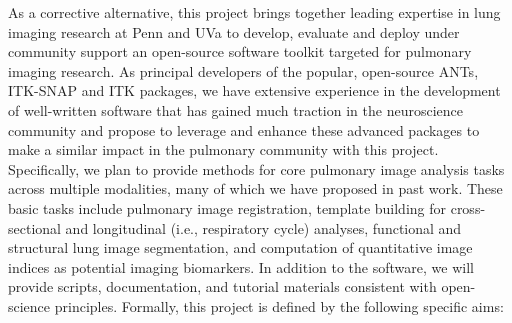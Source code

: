 \documentclass[11pt,]{article}
\begin{document}
As a corrective alternative, this project brings together leading
expertise in lung imaging research at Penn and UVa to develop, evaluate
and deploy under community support an open-source software toolkit
targeted for pulmonary imaging research. As principal developers of the
popular, open-source ANTs, ITK-SNAP and ITK packages, we have extensive
experience in the development of well-written software that has gained
much traction in the neuroscience community and propose to leverage and
enhance these advanced packages to make a similar impact in the
pulmonary community with this project. Specifically, we plan to provide
methods for core pulmonary image analysis tasks across multiple
modalities, many of which we have proposed in past work. These basic
tasks include pulmonary image registration, template building for
cross-sectional and longitudinal (i.e., respiratory cycle) analyses,
functional and structural lung image segmentation, and computation of
quantitative image indices as potential imaging biomarkers. In addition
to the software, we will provide scripts, documentation, and tutorial
materials consistent with open-science principles. Formally, this
project is defined by the following specific aims:
\end{document}
